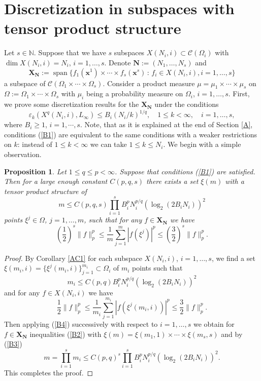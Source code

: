 \documentclass[12pt]{article}
\newcommand{\N}{{\mathbb{N}}}
\def\cC{{\mathcal C}}
\def \e{\varepsilon}
\def \sp{\operatorname{span}}
\def\bx{\mathbf x}
\def\bN{\mathbf N}
\def\bX{\mathbf X}
\newtheorem{Proposition}{Proposition}[section]
\numberwithin{equation}{section}
\newcommand{\be}{\begin{equation}}
\newcommand{\ee}{\end{equation}}
\begin{document}
\section{Discretization in subspaces with tensor product structure}
\label{B}

Let $s\in\N$. Suppose that we have $s$ subspaces $X(N_i,i)\subset \cC(\Omega_i)$
 with $\dim X(N_i,i) = N_i$, $i=1,\dots,s$. Denote $\bN := (N_1,\dots,N_s)$ and 
 $$
 \bX_{\bN} := \sp\{ f_1(\bx^1)\times\cdots\times f_s(\bx^s)\,:\, f_i\in X(N_i,i), i=1,\dots,s\}
 $$
 a subspace of $\cC(\Omega_1\times\cdots\times\Omega_s)$. Consider a product measure $\mu =\mu_1\times\cdots\times\mu_s$ on $\Omega:=\Omega_1\times\cdots\times\Omega_s$ with $\mu_i$ being a probability measure on $\Omega_i$, $i=1,\dots,s$. First, we prove some discretization results 
 for the $\bX_{\bN}$ under the conditions
 \be\label{B1}
\e_k(X^q(N_i,i),L_\infty) \le  B_i (N_i/k)^{1/q}, \quad 1\leq k <\infty, \quad i=1,\dots,s,
\ee
where $B_i\ge 1$, $i=1,\cdots, s$.
Note, that as it is explained at the end of Section \ref{A}, conditions (\ref{B1}) are equivalent to the same conditions with a weaker restrictions on $k$: instead of 
$1\leq k <\infty$ we can take $1\leq k\le N_i$. We begin with a simple observation.

\begin{Proposition}\label{BP1} Let $1\le q \le p<\infty$. Suppose that conditions (\ref{B1}) are satisfied. Then for a large enough constant $C(p,q,s)$ there exists a set $\xi(m)$ with a tensor product structure of
$$
m \le C(p,q,s)\prod_{i=1}^sB_i^{p}N_i^{p/q} (\log_2(2B_iN_i))^2
$$
 points $\xi^j\in \Omega$, $j=1,\dots,m$,   such that for any $f\in \bX_\bN$
we have
\be\label{B2}
\left(\frac{1}{2}\right)^s\|f\|_p^p \le \frac{1}{m}\sum_{j=1}^m |f(\xi^j)|^p \le \left(\frac{3}{2}\right)^s\|f\|_p^p.
\ee
\end{Proposition}
\begin{proof} By Corollary \ref{AC1} for each subspace $X(N_i,i)$, $i=1,\dots,s$, we find a set $\xi(m_i,i)=\{\xi^j(m_i,i)\}_{j=1}^{m_i}\subset \Omega_i$ of $m_i$ points such that 
\be\label{B3}
m_i \le C(p,q)B_i^{p}N_i^{p/q} (\log_2(2B_iN_i))^2
\ee
 and for any $f\in X(N_i,i)$ we have
\be\label{B4}
\frac{1}{2}\|f\|_p^p \le \frac{1}{m_i}\sum_{j=1}^{m_i} |f(\xi^j(m_i,i))|^p \le \frac{3}{2}\|f\|_p^p.
\ee
Then applying (\ref{B4}) successively with respect to $i=1,\dots,s$ we obtain for $f\in \bX_\bN$ inequalities (\ref{B2}) with $\xi(m) = \xi(m_1,1)\times\cdots\times\xi(m_s,s)$
and by (\ref{B3})
$$
m=\prod_{i=1}^s m_i \le C(p,q)^s\prod_{i=1}^sB_i^{p}N_i^{p/q} (\log_2(2B_iN_i))^2.
$$
This completes the proof. 
\end{proof}
\end{document}
